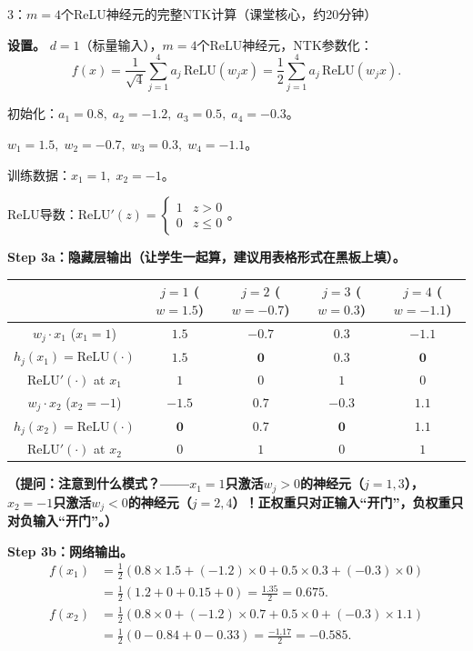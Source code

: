 \documentclass[11pt,a4paper]{article}
\begin{document}
\begin{handcalc}{3：$m=4$个ReLU神经元的完整NTK计算（课堂核心，约20分钟）}

\textbf{设置。} $d=1$（标量输入），$m=4$个ReLU神经元，NTK参数化：
\[
f(x) = \frac{1}{\sqrt{4}}\sum_{j=1}^4 a_j\,\text{ReLU}(w_j x) = \frac{1}{2}\sum_{j=1}^4 a_j\,\text{ReLU}(w_j x).
\]

初始化：$a_1=0.8,\; a_2=-1.2,\; a_3=0.5,\; a_4=-0.3$。

$w_1=1.5,\; w_2=-0.7,\; w_3=0.3,\; w_4=-1.1$。

训练数据：$x_1=1,\; x_2=-1$。

ReLU导数：$\text{ReLU}'(z) = \begin{cases}1 & z>0 \\ 0 & z\le 0\end{cases}$。

\tcblower

\textbf{Step 3a：隐藏层输出（让学生一起算，建议用表格形式在黑板上填）。}

\begin{center}
\renewcommand{\arraystretch}{1.3}
\begin{tabular}{c|cccc}
\toprule
& $j=1$ ($w=1.5$) & $j=2$ ($w=-0.7$) & $j=3$ ($w=0.3$) & $j=4$ ($w=-1.1$) \\
\midrule
$w_j\cdot x_1$ ($x_1=1$) & $1.5$ & $-0.7$ & $0.3$ & $-1.1$ \\
$h_j(x_1)=\text{ReLU}(\cdot)$ & $\mathbf{1.5}$ & $\mathbf{0}$ & $\mathbf{0.3}$ & $\mathbf{0}$ \\
$\text{ReLU}'(\cdot)$ at $x_1$ & $1$ & $0$ & $1$ & $0$ \\
\midrule
$w_j\cdot x_2$ ($x_2=-1$) & $-1.5$ & $0.7$ & $-0.3$ & $1.1$ \\
$h_j(x_2)=\text{ReLU}(\cdot)$ & $\mathbf{0}$ & $\mathbf{0.7}$ & $\mathbf{0}$ & $\mathbf{1.1}$ \\
$\text{ReLU}'(\cdot)$ at $x_2$ & $0$ & $1$ & $0$ & $1$ \\
\bottomrule
\end{tabular}
\end{center}

\textbf{（提问：注意到什么模式？——$x_1=1$只激活$w_j>0$的神经元（$j=1,3$），$x_2=-1$只激活$w_j<0$的神经元（$j=2,4$）！正权重只对正输入``开门''，负权重只对负输入``开门''。）}

\bigskip
\textbf{Step 3b：网络输出。}
\begin{align}
f(x_1) &= \frac{1}{2}(0.8\times 1.5 + (-1.2)\times 0 + 0.5\times 0.3 + (-0.3)\times 0) \\
&= \frac{1}{2}(1.2 + 0 + 0.15 + 0) = \frac{1.35}{2} = 0.675.
\end{align}
\begin{align}
f(x_2) &= \frac{1}{2}(0.8\times 0 + (-1.2)\times 0.7 + 0.5\times 0 + (-0.3)\times 1.1) \\
&= \frac{1}{2}(0 - 0.84 + 0 - 0.33) = \frac{-1.17}{2} = -0.585.
\end{align}


\end{handcalc}
\end{document}
